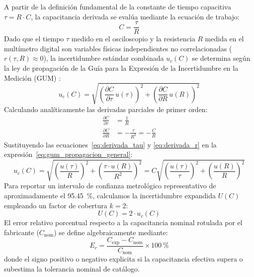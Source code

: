 A partir de la definición fundamental de la constante de tiempo capacitiva $\tau = R \cdot C$, la capacitancia derivada se evalúa mediante la ecuación de trabajo:
\begin{equation}
    C = \frac{\tau}{R}
    \label{eq:trabajo_c}
\end{equation}
Dado que el tiempo $\tau$ medido en el osciloscopio y la resistencia $R$ medida en el multímetro digital son variables físicas independientes no correlacionadas ($r(\tau, R) \approx 0$), la incertidumbre estándar combinada $u_c(C)$ se determina según la ley de propagación de la Guía para la Expresión de la Incertidumbre en la Medición (GUM) \cite{gum}:
\begin{equation}
    u_c(C) = \sqrt{\left( \frac{\partial C}{\partial \tau} \, u(\tau) \right)^2 + \left( \frac{\partial C}{\partial R} \, u(R) \right)^2}
    \label{eq:gum_propagacion_general}
\end{equation}
Calculando analíticamente las derivadas parciales de primer orden:
\begin{align}
    \frac{\partial C}{\partial \tau} &= \frac{1}{R} \label{eq:derivada_tau} \\
    \frac{\partial C}{\partial R} &= -\frac{\tau}{R^2} = -\frac{C}{R} \label{eq:derivada_r}
\end{align}
Sustituyendo las ecuaciones~\eqref{eq:derivada_tau} y \eqref{eq:derivada_r} en la expresión~\eqref{eq:gum_propagacion_general}:
\begin{equation}
    u_c(C) = \sqrt{\left( \frac{u(\tau)}{R} \right)^2 + \left( \frac{\tau \cdot u(R)}{R^2} \right)^2} = C \sqrt{\left(\frac{u(\tau)}{\tau}\right)^2 + \left(\frac{u(R)}{R}\right)^2}
    \label{eq:incertidumbre_relativa_c}
\end{equation}
Para reportar un intervalo de confianza metrológico representativo de aproximadamente el \qty{95,45}{\percent}, calculamos la incertidumbre expandida $U(C)$ empleando un factor de cobertura $k = 2$:
\begin{equation}
    U(C) = 2 \cdot u_c(C)
    \label{eq:incertidumbre_expandida_c}
\end{equation}
El error relativo porcentual respecto a la capacitancia nominal rotulada por el fabricante ($C_{\text{nom}}$) se define algebraicamente mediante:
\begin{equation}
    E_r = \frac{C_{\text{exp}} - C_{\text{nom}}}{C_{\text{nom}}} \times \qty{100}{\percent}
    \label{eq:error_relativo_c}
\end{equation}
donde el signo positivo o negativo explicita si la capacitancia efectiva supera o subestima la tolerancia nominal de catálogo.


